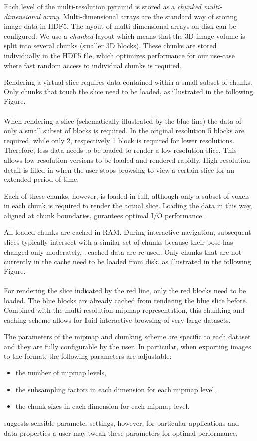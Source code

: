 \documentclass{scrartcl}
\begin{document}
Each level of the multi-resolution pyramid is stored as a \emph{chunked multi-dimensional array}.
Multi-dimensional arrays are the standard way of storing image data in HDF5.
The layout of multi-dimensional arrays on disk can be configured.  We use a \emph{chunked} layout which means that the 3D image volume is split into several chunks (smaller 3D blocks).
These chunks are stored individually in the HDF5 file, which optimizes performance for our use-case where fast random access to individual chunks is required.

Rendering a virtual slice requires data contained within a small subset of chunks.
Only chunks that touch the slice need to be loaded, as illustrated in the following Figure.
\\
\\
When rendering a slice (schematically illustrated by the blue line) the data of only a small subset of blocks is required.
In the original resolution 5 blocks are required, while only 2, respectively 1 block is required for lower resolutions.
Therefore, less data needs to be loaded to render a low-resolution slice.
This allows low-resolution versions to be loaded and rendered rapidly.
High-resolution detail is filled in when the user stops browsing to view a certain slice for an extended period of time.

Each of these chunks, however, is loaded in full, although only a subset of voxels in each chunk is required to render the actual slice.
Loading the data in this way, aligned at chunk boundaries, gurantees optimal I/O performance.

All loaded chunks are cached in RAM.
During interactive navigation, subsequent slices typically intersect with a similar set of chunks because their pose has changed only moderately, \ie. cached data are re-used.
Only chunks that are not currently in the cache need to be loaded from disk, as illustrated in the following Figure.
\\
\\
For rendering the slice indicated by the red line, only the red blocks need to be loaded.
The blue blocks are already cached from rendering the blue slice before.
Combined with the multi-resolution mipmap representation, this chunking and caching scheme allows for fluid interactive browsing of very large datasets.

The parameters of the mipmap and chunking scheme are specific to each dataset and they are fully configurable by the user.
In particular, when exporting images to the \bdv format, the following parameters are adjustable:
\begin{itemize}
  \item the number of mipmap levels,
  \item the subsampling factors in each dimension for each mipmap level,
  \item the chunk sizes in each dimension for each mipmap level.
\end{itemize}
\Bdv suggests sensible parameter settings, however, for particular applications and data properties a user may tweak these parameters for optimal performance.
\end{document}
